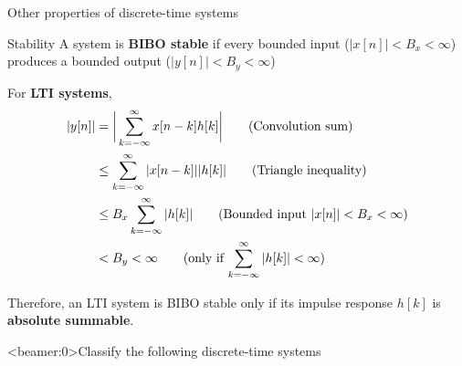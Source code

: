 \documentclass[10pt]{beamer}
\begin{document}
\begin{frame}{Other properties of discrete-time systems}
	
	\begin{block}{Stability}
		A system is \textbf{BIBO stable} if every bounded input ($|x[n]| < B_x < \infty$) produces a bounded output ($|y[n]| < B_y < \infty$)

		\vspace{0.25cm}
		For \textbf{LTI systems},
		\vspace{-0.25cm}
		\begin{align*}
		|y[n]| &= \bigg|\sum_{k = -\infty}^{\infty} x[n-k]h[k]\bigg| \tag{Convolution sum} \\
		&\leq \sum_{k = -\infty}^{\infty} |x[n-k]||h[k]| \tag{Triangle inequality} \\
		& \leq B_x\sum_{k = -\infty}^{\infty} |h[k]| \tag{Bounded input $|x[n]| < B_x < \infty$} \\
		& < B_y < \infty \tag{only if $\displaystyle\sum_{k=-\infty}^{\infty}|h[k]| < \infty$}
		\end{align*}
		\vspace{-0.3cm}
		 
		 Therefore, an LTI system is BIBO stable only if its impulse response $h[k]$ is \textbf{absolute summable}.
	\end{block}
\end{frame}


%
\begin{frame}<beamer:0>{Classify the following discrete-time systems}
	\centering
\end{frame}
\end{document}
